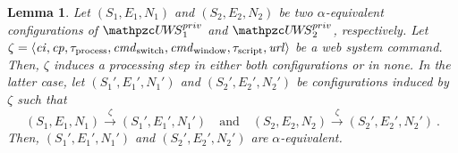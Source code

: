 \documentclass[letterpaper,onecolumn,10pt]{article}
\newtheorem{lemma}{Lemma}
\begin{document}
\begin{lemma}\label{lemma:step-config-private}
  Let $(S_1,E_1,N_1)$ and $(S_2,E_2,N_2)$ be two 
  $\alpha$-equivalent configurations of 
  $\uppressoprivwebsystem_1$ and $\uppressoprivwebsystem_2$, 
  respectively. Let $\zeta = \langle\mathit{ci},\mathit{cp}, 
  \tau_\text{process}, \mathit{cmd}_\text{switch}, 
  \mathit{cmd}_\text{window},\tau_\text{script},\mathit{url}\rangle$
  be a web system command. Then, $\zeta$ induces a processing 
  step in either both configurations or in none. In the latter 
  case, let $(S_1',E_1',N_1')$ and $(S_2',E_2',N_2')$ be 
  configurations induced by $\zeta$ such that
  \[(S_1,E_1,N_1) \xrightarrow{\zeta} (S_1',E_1',N_1') \quad 
  \text{and} \quad (S_2,E_2,N_2) \xrightarrow{\zeta} 
  (S_2',E_2',N_2') \ .\]
  Then, $(S_1',E_1',N_1')$ and $(S_2',E_2',N_2')$ are
  $\alpha$-equivalent.  
\end{lemma}
\end{document}
